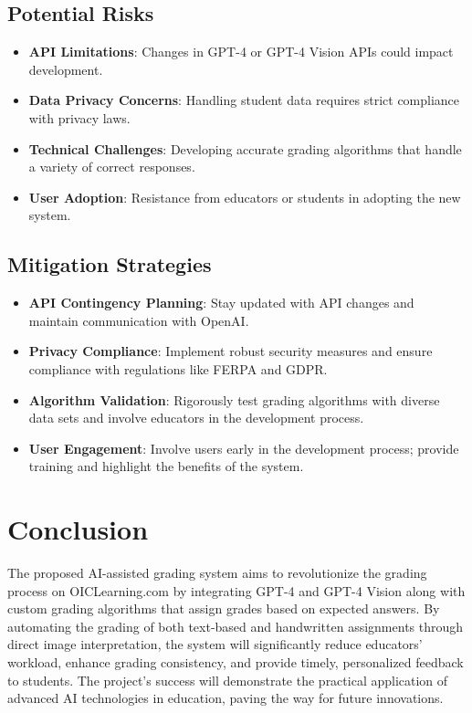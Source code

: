 \documentclass[ms,twoside,print]{nuthesis}
\begin{document}
\subsection{Potential Risks}

\begin{itemize}
    \item \textbf{API Limitations}: Changes in GPT-4 or GPT-4 Vision APIs could impact development.
    \item \textbf{Data Privacy Concerns}: Handling student data requires strict compliance with privacy laws.
    \item \textbf{Technical Challenges}: Developing accurate grading algorithms that handle a variety of correct responses.
    \item \textbf{User Adoption}: Resistance from educators or students in adopting the new system.
\end{itemize}

\subsection{Mitigation Strategies}

\begin{itemize}
    \item \textbf{API Contingency Planning}: Stay updated with API changes and maintain communication with OpenAI.
    \item \textbf{Privacy Compliance}: Implement robust security measures and ensure compliance with regulations like FERPA and GDPR.
    \item \textbf{Algorithm Validation}: Rigorously test grading algorithms with diverse data sets and involve educators in the development process.
    \item \textbf{User Engagement}: Involve users early in the development process; provide training and highlight the benefits of the system.
\end{itemize}

\section{Conclusion}

The proposed AI-assisted grading system aims to revolutionize the grading process on OICLearning.com by integrating GPT-4 and GPT-4 Vision along with custom grading algorithms that assign grades based on expected answers. By automating the grading of both text-based and handwritten assignments through direct image interpretation, the system will significantly reduce educators' workload, enhance grading consistency, and provide timely, personalized feedback to students. The project's success will demonstrate the practical application of advanced AI technologies in education, paving the way for future innovations.
\end{document}
